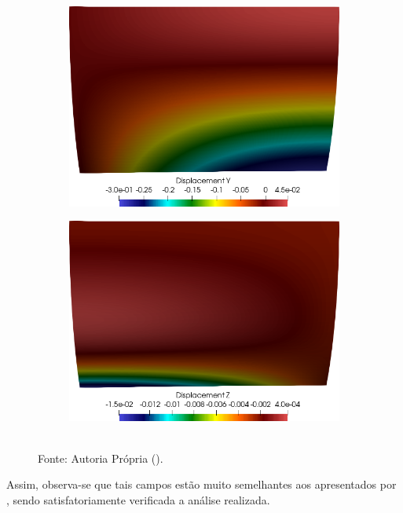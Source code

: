 \begin{figure}[h!]
    \begin{subfigure}{0.4\textwidth}
    \includegraphics[width=\linewidth]{Figuras/scordelis/uy.png}
    \end{subfigure}
    \begin{subfigure}{0.4\textwidth}
    \includegraphics[width=\linewidth]{Figuras/scordelis/uz.png}
    \end{subfigure}
    \\Fonte: Autoria Própria (\the\year).
    \label{fig:scordelis-displ}
\end{figure}

Assim, observa-se que tais campos estão muito semelhantes aos apresentados por , sendo satisfatoriamente verificada a análise realizada.

